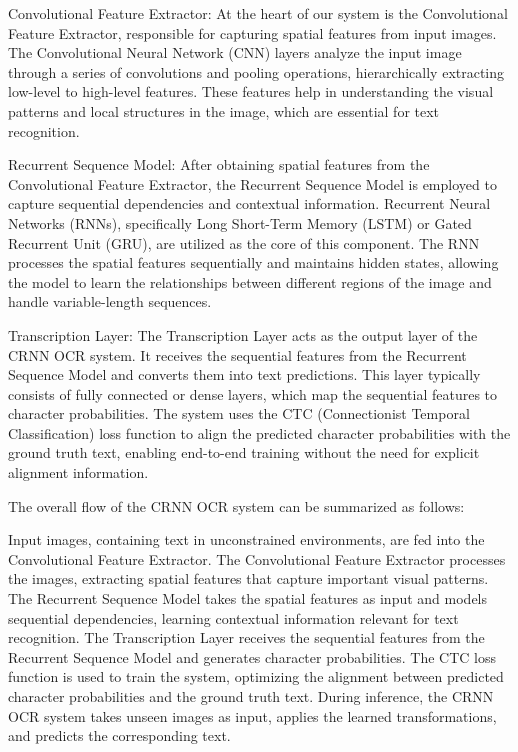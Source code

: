 \documentclass[10pt,twocolumn,letterpaper]{article}
\begin{document}
    Convolutional Feature Extractor:
    At the heart of our system is the Convolutional Feature Extractor, responsible for capturing spatial features from input images. The Convolutional Neural Network (CNN) layers analyze the input image through a series of convolutions and pooling operations, hierarchically extracting low-level to high-level features. These features help in understanding the visual patterns and local structures in the image, which are essential for text recognition.

    Recurrent Sequence Model:
    After obtaining spatial features from the Convolutional Feature Extractor, the Recurrent Sequence Model is employed to capture sequential dependencies and contextual information. Recurrent Neural Networks (RNNs), specifically Long Short-Term Memory (LSTM) or Gated Recurrent Unit (GRU), are utilized as the core of this component. The RNN processes the spatial features sequentially and maintains hidden states, allowing the model to learn the relationships between different regions of the image and handle variable-length sequences.

    Transcription Layer:
    The Transcription Layer acts as the output layer of the CRNN OCR system. It receives the sequential features from the Recurrent Sequence Model and converts them into text predictions. This layer typically consists of fully connected or dense layers, which map the sequential features to character probabilities. The system uses the CTC (Connectionist Temporal Classification) loss function to align the predicted character probabilities with the ground truth text, enabling end-to-end training without the need for explicit alignment information.
    

The overall flow of the CRNN OCR system can be summarized as follows:

    Input images, containing text in unconstrained environments, are fed into the Convolutional Feature Extractor.
    The Convolutional Feature Extractor processes the images, extracting spatial features that capture important visual patterns.
    The Recurrent Sequence Model takes the spatial features as input and models sequential dependencies, learning contextual information relevant for text recognition.
    The Transcription Layer receives the sequential features from the Recurrent Sequence Model and generates character probabilities.
    The CTC loss function is used to train the system, optimizing the alignment between predicted character probabilities and the ground truth text.
    During inference, the CRNN OCR system takes unseen images as input, applies the learned transformations, and predicts the corresponding text.
\end{document}
